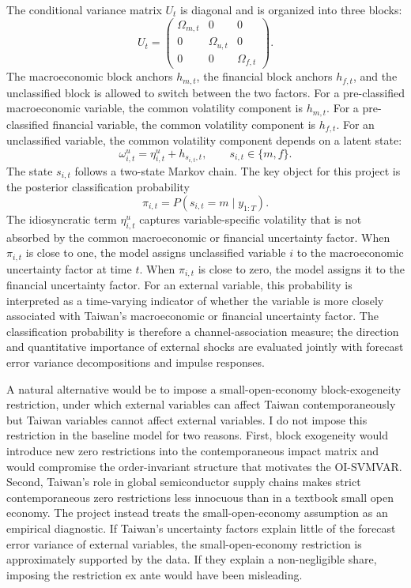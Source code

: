 \documentclass[12pt]{article}
\begin{document}
The conditional variance matrix $U_t$ is diagonal and is organized into three blocks:
\[
U_t
=
\begin{pmatrix}
\Omega_{m,t} & 0 & 0 \\
0 & \Omega_{u,t} & 0 \\
0 & 0 & \Omega_{f,t}
\end{pmatrix}.
\]
The macroeconomic block anchors $h_{m,t}$, the financial block anchors $h_{f,t}$, and the
unclassified block is allowed to switch between the two factors. For a pre-classified
macroeconomic variable, the common volatility component is $h_{m,t}$. For a pre-classified
financial variable, the common volatility component is $h_{f,t}$. For an unclassified variable,
the common volatility component depends on a latent state:
\[
\omega^u_{i,t}
=
\eta^u_{i,t}
+
h_{s_{i,t},t},
\qquad
s_{i,t}\in\{m,f\}.
\]
The state $s_{i,t}$ follows a two-state Markov chain. The key object for this project is the
posterior classification probability
\[
\pi_{i,t}
=
P(s_{i,t}=m \mid y_{1:T}).
\]
The idiosyncratic term $\eta^u_{i,t}$ captures variable-specific volatility that is not absorbed by
the common macroeconomic or financial uncertainty factor.
When $\pi_{i,t}$ is close to one, the model assigns unclassified variable $i$ to the macroeconomic
uncertainty factor at time $t$. When $\pi_{i,t}$ is close to zero, the model assigns it to the
financial uncertainty factor. For an external variable, this probability is interpreted as a
time-varying indicator of whether the variable is more closely associated with Taiwan's
macroeconomic or financial uncertainty factor. The classification probability is therefore a
channel-association measure; the direction and quantitative importance of external shocks are
evaluated jointly with forecast error variance decompositions and impulse responses.

A natural alternative would be to impose a small-open-economy block-exogeneity restriction,
under which external variables can affect Taiwan contemporaneously but Taiwan variables cannot
affect external variables. I do not impose this restriction in the baseline model for two reasons.
First, block exogeneity would introduce new zero restrictions into the contemporaneous impact
matrix and would compromise the order-invariant structure that motivates the OI-SVMVAR.
Second, Taiwan's role in global semiconductor supply chains makes strict contemporaneous
zero restrictions less innocuous than in a textbook small open economy. The project instead treats
the small-open-economy assumption as an empirical diagnostic. If Taiwan's uncertainty factors
explain little of the forecast error variance of external variables, the small-open-economy
restriction is approximately supported by the data. If they explain a non-negligible share, imposing
the restriction ex ante would have been misleading.
\end{document}
